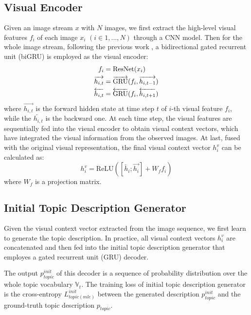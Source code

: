 \documentclass[11pt]{article}
\newcommand{\citep}{\cite}
\begin{document}
\subsection{Visual Encoder}
\label{visual_encoder}
Given an image stream $x$ with $N$ images, we first extract the high-level visual features $f_i$ of each image $x_i$ $(i\in1,...,N)$ through a CNN model. Then for the whole image stream, following the previous work \citep{Wang:2018tda}, a bidirectional gated recurrent unit (biGRU) is employed as the visual encoder:
\begin{equation}
	\setlength{\abovedisplayskip}{3pt} \setlength{\belowdisplayskip}{3pt} \begin{split}\nonumber
f_i &= \text{ResNet}(x_i) \\ 
\overrightarrow{h_{i,t}} &= \overrightarrow{\mbox{GRU}}(f_i, \overrightarrow{h_{i,t-1}}) \\
\overleftarrow{h_{i,t}} &= \overleftarrow{\mbox{GRU}}(f_i, \overleftarrow{h_{i,t+1}}) \\
\end{split}
\end{equation}
where $\overrightarrow{h_{i,t}}$ is the forward hidden state at time step $t$ of $i$-th visual feature $f_i$, while the $\overleftarrow{h_{i,t}}$ is the backward one. At each time step, the visual features are sequentially fed into the visual encoder to obtain visual context vectors, which have integrated the visual information from the observed images. 
At last, fused with the original visual representation, the final visual context vector $h^v_i$ 
can be calculated as:
{
\setlength\abovedisplayskip{1pt}
\setlength\belowdisplayskip{1pt}
\begin{equation}
h^v_i =\text{ReLU}([\overleftarrow{h_i};\overrightarrow{h_i}]+W_ff_i)
\end{equation}
}
where $W_f$ is a projection matrix.\subsection{Initial Topic Description Generator}
\label{initial_topic_generator}

Given the visual context vector extracted from the image sequence, we first learn to generate the topic description. In practice, all visual context vectors $h^v_i$ are concatenated and then fed into the initial topic description generator that employes a gated recurrent unit (GRU) decoder. 

The output $p^{init}_{topic}$ of this decoder is a sequence of probability distribution over the whole topic vocabulary $\mathbb{V}_t$. The training loss of initial topic description generator is the cross-entropy $L^{init}_{topic(mle)}$ between the generated description $p^{init}_{topic}$ and the ground-truth topic description $p_{topic}$.
\end{document}
